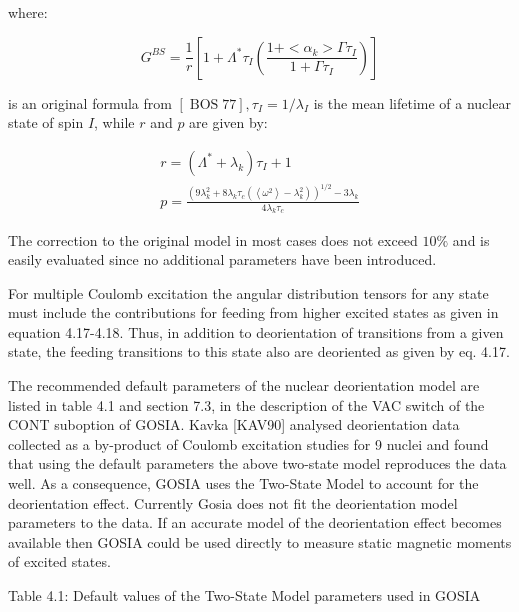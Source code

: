 \documentclass[10pt]{article}
\begin{document}
where:


\begin{equation*}
G^{B S}=\frac{1}{r}\left[1+\Lambda^{*} \tau_{I}\left(\frac{1+<\alpha_{k}>\Gamma \tau_{I}}{1+\Gamma \tau_{I}}\right)\right] \tag{4.31}
\end{equation*}


is an original formula from $[\operatorname{BOS} 77], \tau_{I}=1 / \lambda_{I}$ is the mean lifetime of a nuclear state of spin $I$, while $r$ and $p$ are given by:


\begin{gather*}
r=\left(\Lambda^{*}+\lambda_{k}\right) \tau_{I}+1  \tag{4.32}\\
p=\frac{\left(9 \lambda_{k}^{2}+8 \lambda_{k} \tau_{c}\left(\left\langle\omega^{2}\right\rangle-\lambda_{k}^{2}\right)\right)^{1 / 2}-3 \lambda_{k}}{4 \lambda_{k} \tau_{c}} \tag{4.33}
\end{gather*}


The correction to the original model in most cases does not exceed $10 \%$ and is easily evaluated since no additional parameters have been introduced.

For multiple Coulomb excitation the angular distribution tensors for any state must include the contributions for feeding from higher excited states as given in equation 4.17-4.18. Thus, in addition to deorientation of transitions from a given state, the feeding transitions to this state also are deoriented as given by eq. 4.17.

The recommended default parameters of the nuclear deorientation model are listed in table 4.1 and section 7.3, in the description of the VAC switch of the CONT suboption of GOSIA. Kavka [KAV90] analysed deorientation data collected as a by-product of Coulomb excitation studies for 9 nuclei and found that using the default parameters the above two-state model reproduces the data well. As a consequence, GOSIA uses the Two-State Model to account for the deorientation effect. Currently Gosia does not fit the deorientation model parameters to the data. If an accurate model of the deorientation effect becomes available then GOSIA could be used directly to measure static magnetic moments of excited states.

Table 4.1: Default values of the Two-State Model parameters used in GOSIA
\end{document}
